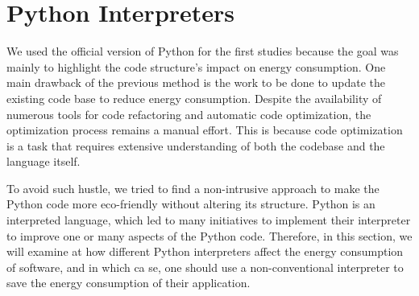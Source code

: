 \section{Python Interpreters}\label{python:sec_interpreters}
We used the official version of Python for the first studies because the goal was mainly to highlight the code structure's impact on energy consumption.
One main drawback of the previous method is the work to be done to update the existing code base to reduce energy consumption.
Despite the availability of numerous tools for code refactoring and automatic code optimization, the optimization process remains a manual effort. This is because code optimization is a task that requires extensive understanding of both the codebase and the language itself.

To avoid such hustle, we tried to find a non-intrusive approach to make the Python code more eco-friendly without altering its structure.
Python is an interpreted language, which led to many initiatives to implement their interpreter to improve one or many aspects of the Python code. 
Therefore, in this section, we will examine at how different Python interpreters affect the energy consumption of software, and in which ca
se, one should use a non-conventional interpreter to save the energy consumption of their application. 

